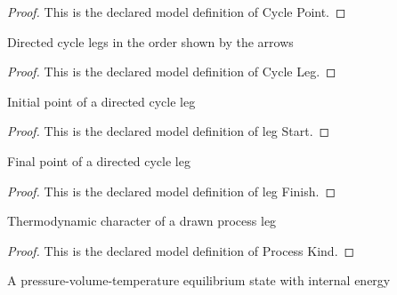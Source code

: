 \begin{proof}
  This is the declared model definition of Cycle Point.
\end{proof}
\begin{definition}
  \label{def:physics:phyx-mini-0431:phyxminiproblems-problemphyxmini0431-cycleleg}
  Directed cycle legs in the order shown by the arrows
\end{definition}
\begin{proof}
  This is the declared model definition of Cycle Leg.
\end{proof}
\begin{definition}
  \label{def:physics:phyx-mini-0431:phyxminiproblems-problemphyxmini0431-legstart}
  Initial point of a directed cycle leg
\end{definition}
\begin{proof}
  This is the declared model definition of leg Start.
\end{proof}
\begin{definition}
  \label{def:physics:phyx-mini-0431:phyxminiproblems-problemphyxmini0431-legfinish}
  Final point of a directed cycle leg
\end{definition}
\begin{proof}
  This is the declared model definition of leg Finish.
\end{proof}
\begin{definition}
  \label{def:physics:phyx-mini-0431:phyxminiproblems-problemphyxmini0431-processkind}
  Thermodynamic character of a drawn process leg
\end{definition}
\begin{proof}
  This is the declared model definition of Process Kind.
\end{proof}
\begin{definition}
  \label{def:physics:phyx-mini-0431:phyxminiproblems-problemphyxmini0431-thermodynamicstate}
  A pressure-volume-temperature equilibrium state with internal energy
\end{definition}
